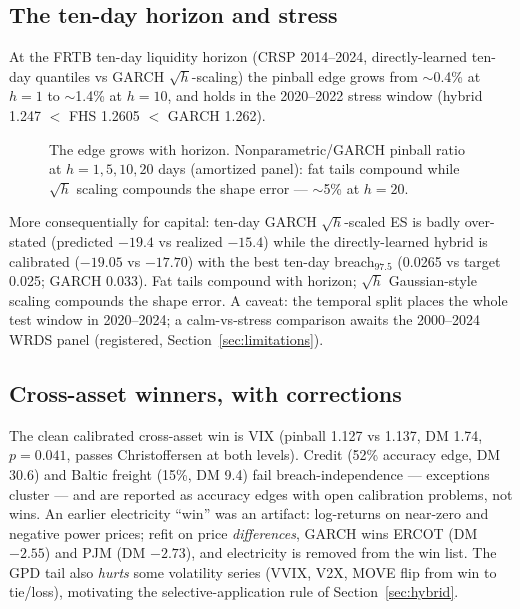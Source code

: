 \documentclass[11pt]{article}
\theoremstyle{remark}
\begin{document}
\subsection{The ten-day horizon and stress}

At the FRTB ten-day liquidity horizon (CRSP 2014--2024, directly-learned
ten-day quantiles vs GARCH $\sqrt{h}$-scaling) the pinball edge grows
from $\sim$0.4\% at $h=1$ to $\sim$1.4\% at $h=10$, and holds in the
2020--2022 stress window (hybrid 1.247 $<$ FHS 1.2605 $<$ GARCH 1.262).
\begin{figure}[t]
\centering
{}
\caption{The edge grows with horizon. Nonparametric/GARCH pinball ratio
at $h = 1, 5, 10, 20$ days (amortized panel): fat tails compound while
$\sqrt{h}$ scaling compounds the shape error --- $\sim$5\% at $h=20$.}
\label{fig:horizon}
\end{figure}

More consequentially for capital: ten-day GARCH $\sqrt{h}$-scaled ES is
badly over-stated (predicted $-19.4$ vs realized $-15.4$) while the
directly-learned hybrid is calibrated ($-19.05$ vs $-17.70$) with the
best ten-day breach$_{97.5}$ (0.0265 vs target 0.025; GARCH 0.033). Fat
tails compound with horizon; $\sqrt{h}$ Gaussian-style scaling
compounds the shape error. A caveat: the temporal split places the whole
test window in 2020--2024; a calm-vs-stress comparison awaits the
2000--2024 WRDS panel (registered, Section~\ref{sec:limitations}).

\subsection{Cross-asset winners, with corrections}

The clean calibrated cross-asset win is VIX (pinball 1.127 vs 1.137, DM
1.74, $p=0.041$, passes Christoffersen at both levels). Credit (52\%
accuracy edge, DM 30.6) and Baltic freight (15\%, DM 9.4) fail
breach-independence --- exceptions cluster --- and are reported as
accuracy edges with open calibration problems, not wins. An earlier
electricity ``win'' was an artifact: log-returns on near-zero and
negative power prices; refit on price \emph{differences}, GARCH wins
ERCOT (DM $-2.55$) and PJM (DM $-2.73$), and electricity is removed
from the win list. The GPD tail also \emph{hurts} some volatility
series (VVIX, V2X, MOVE flip from win to tie/loss), motivating the
selective-application rule of Section~\ref{sec:hybrid}.
\end{document}
